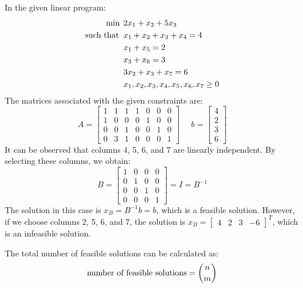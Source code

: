 \documentclass[12pt, a4paper]{report}
\begin{document}
    \begin{example}
        In the given linear program:
        \begin{align*}
            \min                      \:&\: 2x_1+x_2+5x_3          \\
            \textnormal{such that }     &\: x_1+x_2+x_3+x_4=4  \\
                                        &\: x_1+x_5=2  \\
                                        &\: x_3+x_6=3 \\
                                        &\: 3x_2+x_3+x_7=6  \\
                                        &\: x_1,x_2,x_3,x_4,x_5,x_6,x_7 \geq 0
        \end{align*}
        The matrices associated with the given constraints are:
        \[
        A=
        \begin{bmatrix}
            1 & 1 & 1 & 1 & 0 & 0 & 0 \\
            1 & 0 & 0 & 0 & 1 & 0 & 0 \\
            0 & 0 & 1 & 0 & 0 & 1 & 0 \\
            0 & 3 & 1 & 0 & 0 & 0 & 1
        \end{bmatrix}
        \:\:\:\:\:\:
        b=
        \begin{bmatrix}
            4 \\
            2 \\
            3 \\
            6
        \end{bmatrix}
        \]
        It can be observed that columns 4, 5, 6, and 7 are linearly independent. 
        By selecting these columns, we obtain:
        \[
        B= 
        \begin{bmatrix}
            1 & 0 & 0 & 0 \\
            0 & 1 & 0 & 0 \\
            0 & 0 & 1 & 0 \\
            0 & 0 & 0 & 1
        \end{bmatrix}
        =I=B^{-1}
        \]
        The solution in this case is $x_B=B^{-1}b=b$, which is a feasible solution.
        However, if we choose columns 2, 5, 6, and 7, the solution is $x_B=\begin{bmatrix} 4 & 2 & 3 & -6 \end{bmatrix}^T$, which is an infeasible solution.
    \end{example}
    The total number of feasible solutions can be calculated as:
    \[\textnormal{number of feasible solutions}=\binom{n}{m}\]
\end{document}
